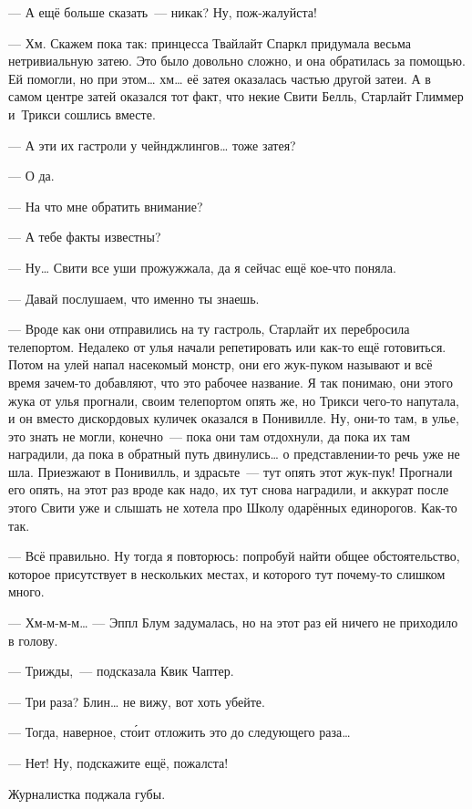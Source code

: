 \documentclass[fontsize=11pt,a5paper,titlepage=firstcover]{scrbook}
\begin{document}
--- А ещё больше сказать~--- никак? Ну, пож-жалуйста!

--- Хм. Скажем пока так: принцесса Твайлайт Спаркл придумала весьма нетривиальную затею. Это было довольно сложно, и она обратилась за помощью. Ей помогли, но при этом{\ldots} хм{\ldots} её затея оказалась частью другой затеи. А в самом центре затей оказался тот факт, что некие Свити Белль, Старлайт Глиммер и~Трикси сошлись вместе.

--- А эти их гастроли у чейнджлингов{\ldots} тоже затея?

--- О да.

--- На что мне обратить внимание?

--- А тебе факты известны?

--- Ну{\ldots} Свити все уши прожужжала, да я сейчас ещё кое-что поняла.

--- Давай послушаем, что именно ты знаешь.

--- Вроде как они отправились на ту гастроль, Старлайт их перебросила телепортом. Недалеко от улья начали репетировать или как-то ещё готовиться. Потом на улей напал насекомый монстр, они его жук-пуком называют и всё время зачем-то добавляют, что это рабочее название. Я так понимаю, они этого жука от улья прогнали, своим телепортом опять же, но Трикси чего-то напутала, и он вместо дискордовых куличек оказался в Понивилле. Ну, они-то там, в улье, это знать не могли, конечно~--- пока они там отдохнули, да пока их там наградили, да пока в обратный путь двинулись{\ldots} о представлении-то речь уже не шла. Приезжают в Понивилль, и здрасьте~--- тут опять этот жук-пук! Прогнали его опять, на этот раз вроде как надо, их тут снова наградили, и аккурат после этого Свити уже и слышать не хотела про Школу одарённых единорогов. Как-то так.

--- Всё правильно. Ну тогда я повторюсь: попробуй найти общее обстоятельство, которое присутствует в нескольких местах, и которого тут почему-то слишком много.

--- Хм-м-м-м{\ldots} --- Эппл Блум задумалась, но на этот раз ей ничего не приходило в голову.

--- Трижды,~--- подсказала Квик Чаптер.

--- Три раза? Блин{\ldots} не вижу, вот хоть убейте.

--- Тогда, наверное, сто́ит отложить это до следующего раза{\ldots}

--- Нет! Ну, подскажите ещё, пожалста!

Журналистка поджала губы.
\end{document}
